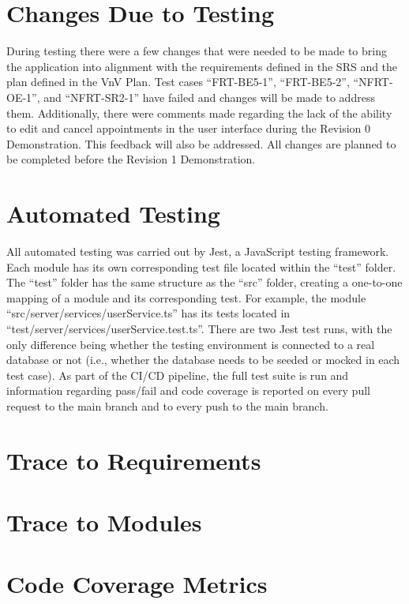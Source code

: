 \documentclass[12pt, titlepage]{article}
\begin{document}
\newpage

\section{Changes Due to Testing}

During testing there were a few changes that were needed to be made to bring the application into
alignment with the requirements defined in the SRS and the plan defined in the VnV Plan. Test cases
``FRT-BE5-1'', ``FRT-BE5-2'', ``NFRT-OE-1'', and ``NFRT-SR2-1'' have failed and changes will be
made to address them. Additionally, there were comments made regarding the lack of the ability to
edit and cancel appointments in the user interface during the Revision 0 Demonstration. This
feedback will also be addressed. All changes are planned to be completed before the Revision 1
Demonstration.

\section{Automated Testing}

All automated testing was carried out by Jest, a JavaScript testing framework. Each module has its
own corresponding test file located within the ``test'' folder. The ``test'' folder has the same
structure as the ``src'' folder, creating a one-to-one mapping of a module and its corresponding
test. For example, the module ``src/server/services/userService.ts'' has its tests located in
``test/server/services/userService.test.ts''. There are two Jest test runs, with the only
difference being whether the testing environment is connected to a real database or not (i.e.,
whether the database needs to be seeded or mocked in each test case). As part of the CI/CD
pipeline, the full test suite is run and information regarding pass/fail and code coverage is
reported on every pull request to the main branch and to every push to the main branch.

\section{Trace to Requirements}

\section{Trace to Modules}

\section{Code Coverage Metrics}
\end{document}

